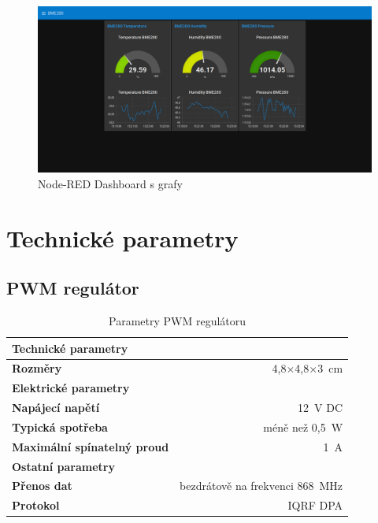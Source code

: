\documentclass[12pt,a4paper]{article}
\begin{document}
\begin{figure}[H]
\centering
\label{fig:node-red_dashboard}
\includegraphics[width = 150mm]{img/node-red_dashboard.png}
\caption{Node-RED Dashboard s grafy}
\end{figure}

\newpage

\section{Technické parametry}

\subsection{PWM regulátor}

\begin{table}[H]
  \centering
  \begin{tabular}{lr}
    \hline
    \textbf{Technické parametry} & ~ \\
    \hline
    \hline
    \textbf{Rozměry} & 4,8$\times$4,8$\times$3~cm \\
    \hline
    \textbf{Elektrické parametry} \\
    \hline
    \hline
    \textbf{Napájecí napětí} & 12~V DC\index[zkr]{DC!Direct current|textit} \\
    \textbf{Typická spotřeba} & méně než 0,5~W \\
    \textbf{Maximální spínatelný proud} & 1~A \\
    \hline
    \textbf{Ostatní parametry} \\
    \hline
    \hline
    \textbf{Přenos dat} & bezdrátově na frekvenci 868~MHz \\
    \textbf{Protokol} & IQRF DPA \\
  \end{tabular}
  \caption{Parametry PWM regulátoru}\label{table:parametry/fan-regulator}
\end{table}
\end{document}
